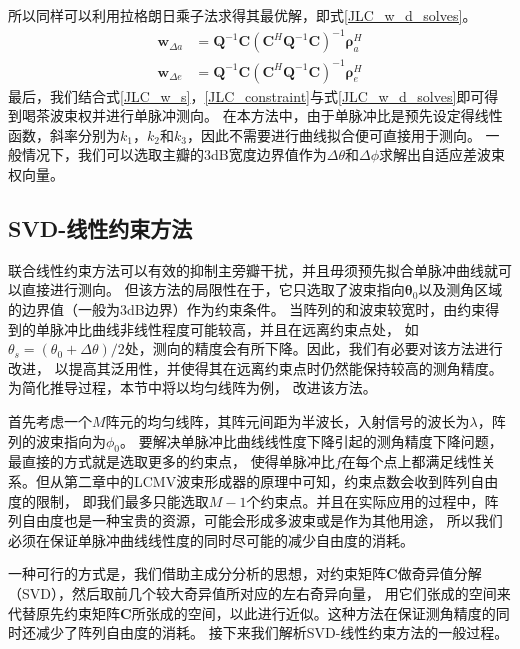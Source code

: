 \documentclass[master]{thesis-uestc}
\begin{document}
所以同样可以利用拉格朗日乘子法求得其最优解，即式\eqref{JLC_w_d_solves}。
\begin{subequations}\label{JLC_w_d_solves}
    \begin{align}
        \bm{w}_{\Delta a} &= \bm{Q}^{-1}\bm{C}\left(\bm{C}^H\bm{Q}^{-1}\bm{C}\right)^{-1}\bm{\rho}^H_a \\
        \bm{w}_{\Delta e} &= \bm{Q}^{-1}\bm{C}\left(\bm{C}^H\bm{Q}^{-1}\bm{C}\right)^{-1}\bm{\rho}^H_e
    \end{align}
\end{subequations}
最后，我们结合式\eqref{JLC_w_s}，\eqref{JLC_constraint}与式\eqref{JLC_w_d_solves}即可得到喝茶波束权并进行单脉冲测向。
在本方法中，由于单脉冲比是预先设定得线性函数，斜率分别为$k_1$，$k_2$和$k_3$，因此不需要进行曲线拟合便可直接用于测向。
一般情况下，我们可以选取主瓣的3dB宽度边界值作为$\Delta\theta$和$\Delta\phi$求解出自适应差波束权向量。

\subsection{SVD-线性约束方法}
联合线性约束方法可以有效的抑制主旁瓣干扰，并且毋须预先拟合单脉冲曲线就可以直接进行测向。
但该方法的局限性在于，它只选取了波束指向$\bm{\theta}_0$以及测角区域的边界值（一般为3dB边界）作为约束条件。
当阵列的和波束较宽时，由约束得到的单脉冲比曲线非线性程度可能较高，并且在远离约束点处，
如$\theta_s=(\theta_0+\Delta\theta)/2$处，测向的精度会有所下降。因此，我们有必要对该方法进行改进，
以提高其泛用性，并使得其在远离约束点时仍然能保持较高的测角精度。为简化推导过程，本节中将以均匀线阵为例，
改进该方法。

首先考虑一个$M$阵元的均匀线阵，其阵元间距为半波长，入射信号的波长为$\lambda$，阵列的波束指向为$\phi_0$。
要解决单脉冲比曲线线性度下降引起的测角精度下降问题，最直接的方式就是选取更多的约束点，
使得单脉冲比$f$在每个点上都满足线性关系。但从第二章中的LCMV波束形成器的原理中可知，约束点数会收到阵列自由度的限制，
即我们最多只能选取$M-1$个约束点。并且在实际应用的过程中，阵列自由度也是一种宝贵的资源，可能会形成多波束或是作为其他用途，
所以我们必须在保证单脉冲曲线线性度的同时尽可能的减少自由度的消耗。

一种可行的方式是，我们借助主成分分析的思想，对约束矩阵$\bm{C}$做奇异值分解（SVD），然后取前几个较大奇异值所对应的左右奇异向量，
用它们张成的空间来代替原先约束矩阵$\bm{C}$所张成的空间，以此进行近似。这种方法在保证测角精度的同时还减少了阵列自由度的消耗。
接下来我们解析SVD-线性约束方法的一般过程。
\end{document}
